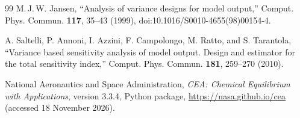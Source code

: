 \documentclass[11pt,a4paper]{article}
\begin{document}
\begin{thebibliography}{99}
 M.\,J.\,W. Jansen, ``Analysis of variance designs for model output,'' Comput. Phys. Commun. \textbf{117}, 35--43 (1999), doi:10.1016/S0010-4655(98)00154-4.

 A. Saltelli, P. Annoni, I. Azzini, F. Campolongo, M. Ratto, and S. Tarantola, ``Variance based sensitivity analysis of model output. Design and estimator for the total sensitivity index,'' Comput. Phys. Commun. \textbf{181}, 259--270 (2010).

 National Aeronautics and Space Administration, \emph{CEA: Chemical Equilibrium with Applications}, version 3.3.4, Python package, \url{https://nasa.github.io/cea} (accessed 18 November 2026).

\end{thebibliography}
\end{document}
